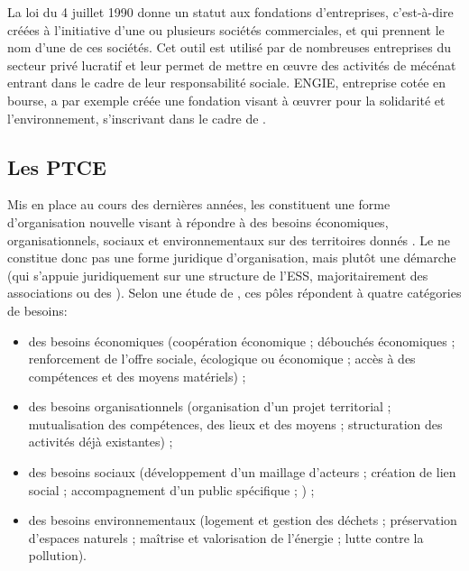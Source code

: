         La loi du 4 juillet 1990 donne un statut aux fondations d’entreprises, c’est-à-dire créées à l’initiative d’une ou plusieurs sociétés commerciales, et qui prennent le nom d’une de ces sociétés. Cet outil est utilisé par de nombreuses entreprises du secteur privé lucratif et leur permet de mettre en œuvre des activités de mécénat entrant dans le cadre de leur responsabilité sociale. ENGIE, entreprise cotée en bourse, a par exemple créée une fondation visant à œuvrer pour la solidarité et l’environnement, s’inscrivant dans le cadre de .

    \subsection{Les PTCE}
      \label{ptce}
        Mis en place au cours des dernières années, les \ptce constituent une forme d'organisation nouvelle visant à répondre à des besoins économiques, organisationnels, sociaux et environnementaux sur des territoires donnés \parencite{le_labo_de_less2017enquete}.
        \parencite[][article 9]{noauthor2014loi}
        Le \ptce ne constitue donc pas une forme juridique d'organisation, mais plutôt une démarche (qui s'appuie juridiquement sur une structure de l'ESS, majoritairement des associations ou des \scic). Selon une étude de \textcite{le_labo_de_less2017enquete}, ces pôles répondent à quatre catégories de besoins:
        \begin{itemize}
            \item des besoins économiques (coopération économique ; débouchés économiques ; renforcement de l'offre sociale, écologique ou économique ; accès à des compétences et des moyens matériels) ;
            \item des besoins organisationnels (organisation d'un projet territorial ; mutualisation des compétences, des lieux et des moyens ; structuration des activités déjà existantes) ;
            \item des besoins sociaux (développement d'un maillage d'acteurs ; création de lien social ; accompagnement d'un public spécifique ; \rse) ;
            \item des besoins environnementaux (logement et gestion des déchets ; préservation d'espaces naturels ; maîtrise et valorisation de l'énergie ; lutte contre la pollution). \\
        \end{itemize}
